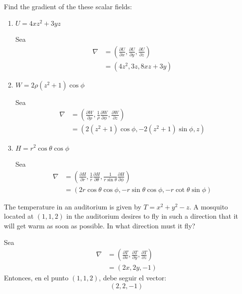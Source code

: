 \begin{problema}
    

    Find the gradient of the these scalar fields:
    \begin{enumerate}
        \item $U=4 x z^{2}+3 y z$
        \begin{sol}
            Sea
            \begin{align*}
                \nabla &= \left(\frac{\partial U}{\partial x},\frac{\partial U}{\partial y},\frac{\partial U}{\partial z}\right)\\
                &= \left(4z^2, 3z,8xz+3y\right)
            \end{align*}
        \end{sol}
        \item $W=2 \rho\left(z^{2}+1\right) \cos \phi$
        \begin{sol}
            Sea
            \begin{align*}
                \nabla &= \left(\frac{\partial W}{\partial \rho},\frac{1}{\rho }\frac{\partial W}{\partial \phi },\frac{\partial W}{\partial z}\right)\\
                &= \left(2\left(z^{2}+1\right) \cos \phi, -2 \left(z^{2}+1\right) \sin\phi,z\right)
            \end{align*}
        \end{sol}
        \item $H=r^{2} \cos \theta \cos \phi$
        \begin{sol}
            Sea
            \begin{align*}
                \nabla &= \left(\frac{\partial H}{\partial r},\frac{1}{r}\frac{\partial H}{\partial \theta},\frac{1}{r\sin \theta}\frac{\partial H}{\partial \phi}\right)\\
                &= \left(2r \cos \theta \cos \phi,-r \sin \theta \cos \phi,-r \cot \theta \sin \phi\right)
            \end{align*}
        \end{sol}
    \end{enumerate}

\end{problema}

\begin{problema}
    The temperature in an auditorium is given by $T=x^{2}+y^{2}-z$. A mosquito located at $(1,1,2)$ in the auditorium desires to fly in such a direction that it will get warm as soon as possible. In what direction must it fly?
    \begin{sol}
        Sea
        \begin{align*}
            \nabla &= \left(\frac{\partial T}{\partial x},\frac{\partial T}{\partial y},\frac{\partial T}{\partial z}\right)\\
            &= \left(2x,2y,-1\right)
        \end{align*}
        Entonces, en el punto $(1,1,2)$, debe seguir el vector: 
        $$\left(2,2,-1\right)$$
    \end{sol}
\end{problema}

